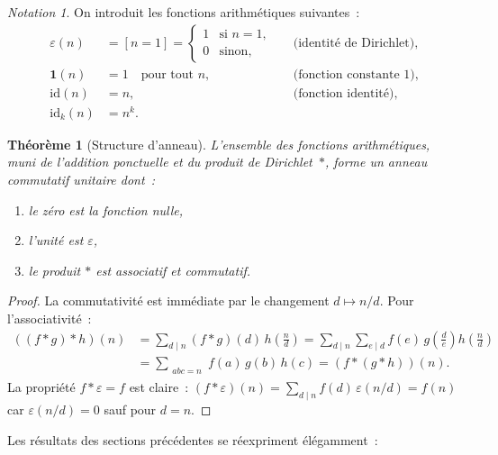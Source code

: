\documentclass[12pt,a4paper,openany]{book}
\theoremstyle{definition}
\theoremstyle{plain}
\newtheorem{theoreme}[definition]{Théorème}
\theoremstyle{remark}
\newtheorem{notation}[definition]{Notation}
\begin{document}
\begin{notation}
\label{not:fonctions-speciales}
On introduit les fonctions arithmétiques suivantes~:
\begin{align*}
  \varepsilon(n) &= [n = 1] = \begin{cases} 1 & \text{si } n = 1, \\ 0 & \text{sinon,}
    \end{cases}
    &&\text{(identité de Dirichlet),} \\
  \mathbf{1}(n) &= 1 \quad \text{pour tout } n,
    &&\text{(fonction constante~$1$),} \\
  \mathrm{id}(n) &= n,
    &&\text{(fonction identité),} \\
  \mathrm{id}_k(n) &= n^k.
\end{align*}
\end{notation}

\begin{theoreme}[Structure d'anneau]
\label{thm:anneau-dirichlet}
L'ensemble des fonctions arithmétiques, muni de l'addition ponctuelle et du produit de
Dirichlet~$*$, forme un anneau commutatif unitaire dont~:
\begin{enumerate}[label=(\roman*)]
  \item le zéro est la fonction nulle,
  \item l'unité est $\varepsilon$,
  \item le produit $*$ est associatif et commutatif.
\end{enumerate}
\end{theoreme}

\begin{proof}
La commutativité est immédiate par le changement $d \mapsto n/d$. Pour l'associativité~:
\begin{align*}
  ((f*g)*h)(n)
    &= \sum_{d \mid n} (f*g)(d)\, h\!\left(\frac{n}{d}\right)
     = \sum_{d \mid n} \sum_{e \mid d} f(e)\, g\!\left(\frac{d}{e}\right)
       h\!\left(\frac{n}{d}\right) \\
    &= \sum_{\substack{abc = n}} f(a)\, g(b)\, h(c)
     = (f*(g*h))(n).
\end{align*}
La propriété $f * \varepsilon = f$ est claire~: $(f * \varepsilon)(n) = \sum_{d \mid n}
f(d)\,\varepsilon(n/d) = f(n)$ car $\varepsilon(n/d) = 0$ sauf pour $d = n$.
\end{proof}

Les résultats des sections précédentes se réexpriment élégamment~:
\end{document}
